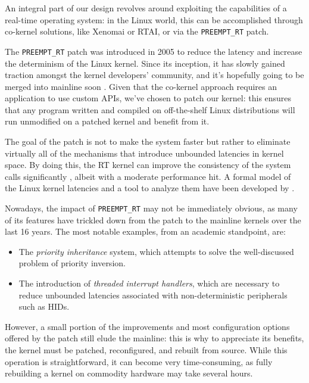 \documentclass[a4paper,12pt]{report}
\begin{document}
An integral part of our design revolves around exploiting the capabilities of a real-time operating system: in the Linux world, this can be accomplished through co-kernel solutions, like Xenomai or RTAI, or via the \texttt{PREEMPT\_RT} patch.

The \texttt{PREEMPT\_RT} patch was introduced in 2005 to reduce the latency and increase the determinism of the Linux kernel. Since its inception, it has slowly gained traction amongst the kernel developers' community, and it's hopefully going to be merged into mainline soon \cite{lwn-rt-future}. Given that the co-kernel approach requires an application to use custom APIs, we've chosen to patch our kernel: this ensures that any program written and compiled on off-the-shelf Linux distributions will run unmodified on a patched kernel and benefit from it.

The goal of the patch is not to make the system faster but rather to eliminate virtually all of the mechanisms that introduce unbounded latencies in kernel space. By doing this, the RT kernel can improve the consistency of the system calls significantly \cite{dmoceri-benchmarking-rtlinux}, albeit with a moderate performance hit. A formal model of the Linux kernel latencies and a tool to analyze them have been developed by \textcite{demistifying-rt-latency}.

Nowadays, the impact of \texttt{PREEMPT\_RT} may not be immediately obvious, as many of its features have trickled down from the patch to the mainline kernels over the last 16 years. The most notable examples, from an academic standpoint, are:

\begin{itemize}
    \item The \textit{priority inheritance} system, which attempts to solve the well-discussed problem of priority inversion.
    \item The introduction of \textit{threaded interrupt handlers}, which are necessary to reduce unbounded latencies associated with non-deterministic peripherals such as HIDs.
\end{itemize}

However, a small portion of the improvements and most configuration options offered by the patch still elude the mainline: this is why to appreciate its benefits, the kernel must be patched, reconfigured, and rebuilt from source. While this operation is straightforward, it can become very time-consuming, as fully rebuilding a kernel on commodity hardware may take several hours.
\end{document}
